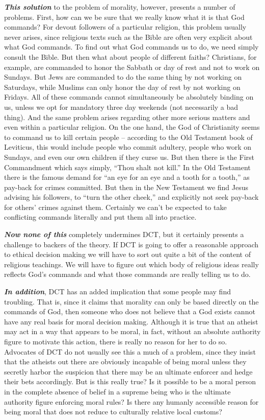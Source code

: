 \documentclass[12pt, openany]{book}
\begin{document}
\textbf{\emph{This solution}} to the problem of morality, however, presents a number of problems. First, how can we be sure that we really know what it is that God commands? For devout followers of a particular religion, this problem usually never arises, since religious texts such as the Bible are often very explicit about what God commands. To find out what God commands us to do, we need simply consult the Bible. But then what about people of different faiths? Christians, for example, are commanded to honor the Sabbath or day of rest and not to work on Sundays. But Jews are commanded to do the same thing by not working on Saturdays, while Muslims can only honor the day of rest by not working on Fridays. All of these commands cannot simultaneously be absolutely binding on us, unless we opt for mandatory three day weekends (not necessarily a bad thing). And the same problem arises regarding other more serious matters and even within a particular religion. On the one hand, the God of Christianity seems to command us to kill certain people -- according to the Old Testament book of Leviticus, this would include people who commit adultery, people who work on Sundays, and even our own children if they curse us. But then there is the First Commandment which says simply, ``Thou shalt not kill.'' In the Old Testament there is the famous demand for ``an eye for an eye and a tooth for a tooth,'' as pay-back for crimes committed. But then in the New Testament we find Jesus advising his followers, to ``turn the other cheek,'' and explicitly not seek pay-back for others' crimes against them. Certainly we can't be expected to take conflicting commands literally and put them all into practice.

\textbf{\emph{Now none of this }} completely undermines DCT, but it certainly presents a challenge to backers of the theory. If DCT is going to offer a reasonable approach to ethical decision making we will have to sort out quite a bit of the content of religious teachings. We will have to figure out which body of religious ideas really reflects God's commands and what those commands are really telling us to do.

\textbf{\emph{In addition}}, DCT has an added implication that some people may find troubling. That is, since it claims that morality can only be based directly on the commands of God, then someone who does not believe that a God exists cannot have any real basis for moral decision making. Although it is true that an atheist may act in a way that appears to be moral, in fact, without an absolute authority figure to motivate this action, there is really no reason for her to do so. Advocates of DCT do not usually see this a much of a problem, since they insist that the atheists out there are obviously incapable of being moral unless they secretly harbor the suspicion that there may be an ultimate enforcer and hedge their bets accordingly. But is this really true? Is it possible to be a moral person in the complete absence of belief in a supreme being who is the ultimate authority figure enforcing moral rules? Is there any humanly accessible reason for being moral that does not reduce to culturally relative local customs?
\end{document}
